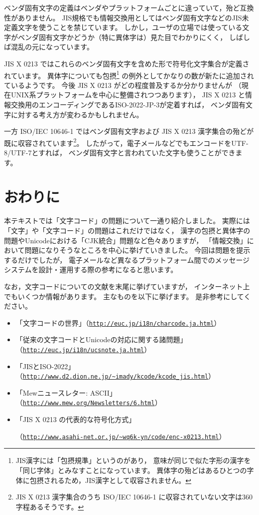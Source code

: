 \documentclass[a4j,10pt,fleqn,uplatex]{jsarticle}
\begin{document}
ベンダ固有文字の定義はベンダやプラットフォームごとに違っていて，殆ど互換性がありません。
JIS規格でも情報交換用としてはベンダ固有文字などのJIS未定義文字を使うことを禁じています。
しかし，ユーザの立場では使っている文字がベンダ固有文字かどうか（特に異体字は）見た目でわかりにくく，
しばしば混乱の元になっています。

JIS X 0213 ではこれらのベンダ固有文字を含めた形で符号化文字集合が定義されています。
異体字についても包摂\footnote{
    JIS漢字には「包摂規準」というのがあり，
    意味が同じで似た字形の漢字を「同じ字体」とみなすことになっています。
    異体字の殆どはあるひとつの字体に包摂されるため，JIS漢字として収容されません。
} の例外としてかなりの数が新たに追加されているようです。
今後 JIS X 0213 がどの程度普及するか分かりませんが
（現在UNIX系プラットフォームを中心に整備されつつあります），
JIS X 0213 と情報交換用のエンコーディングであるISO-2022-JP-3が定着すれば，
ベンダ固有文字に対する考え方が変わるかもしれません。

一方 ISO/IEC 10646-1 ではベンダ固有文字および JIS X 0213 漢字集合の殆どが既に収容されています\footnote{
    JIS X 0213 漢字集合のうち ISO/IEC 10646-1 に収容されていない文字は360字程あるそうです。
}。
したがって，電子メールなどでもエンコードをUTF-8/UTF-7とすれば，
ベンダ固有文字と言われていた文字も使うことができます。


\section{おわりに}

本テキストでは「文字コード」の問題について一通り紹介しました。
実際には「文字」や「文字コード」の問題はこれだけではなく，
漢字の包摂と異体字の問題やUnicodeにおける「CJK統合」問題など色々ありますが，
「情報交換」において問題になりそうなところを中心に挙げていきました。
今回は問題を提示するだけでしたが，
電子メールなど異なるプラットフォーム間でのメッセージシステムを設計・運用する際の参考になると思います。

なお，文字コードについての文献を末尾に挙げていますが，
インターネット上でもいくつか情報があります。
主なものを以下に挙げます。
是非参考にしてください。
\begin{itemize}
\item 「文字コードの世界」（\href{http://euc.jp/i18n/charcode.ja.html}{\texttt{http://euc.jp/i18n/charcode.ja.html}}）
\item 「従来の文字コードとUnicodeの対応に関する諸問題」（\href{http://euc.jp/i18n/ucsnote.ja.html}{\texttt{http://euc.jp/i18n/ucsnote.ja.html}}）
\item 「JISとISO-2022」（\href{http://www.d2.dion.ne.jp/~imady/kcode/kcode_jis.html}{\texttt{http://www.d2.dion.ne.jp/\~{}imady/kcode/kcode\_jis.html}}）
\item 「Mewニュースレター: ASCII」（\href{http://www.mew.org/Newsletters/6.html}{\texttt{http://www.mew.org/Newsletters/6.html}}）
\item 「JIS X 0213 の代表的な符号化方式」\par
    （\href{http://www.asahi-net.or.jp/~wq6k-yn/code/enc-x0213.html}{\texttt{http://www.asahi-net.or.jp/\~{}wq6k-yn/code/enc-x0213.html}}）
\end{itemize}


\nocite{Book:JISHandbook}\nocite{Book:CharCode}\nocite{Book:CharCode2}


\printbibliography[title=参考文献]
\end{document}
